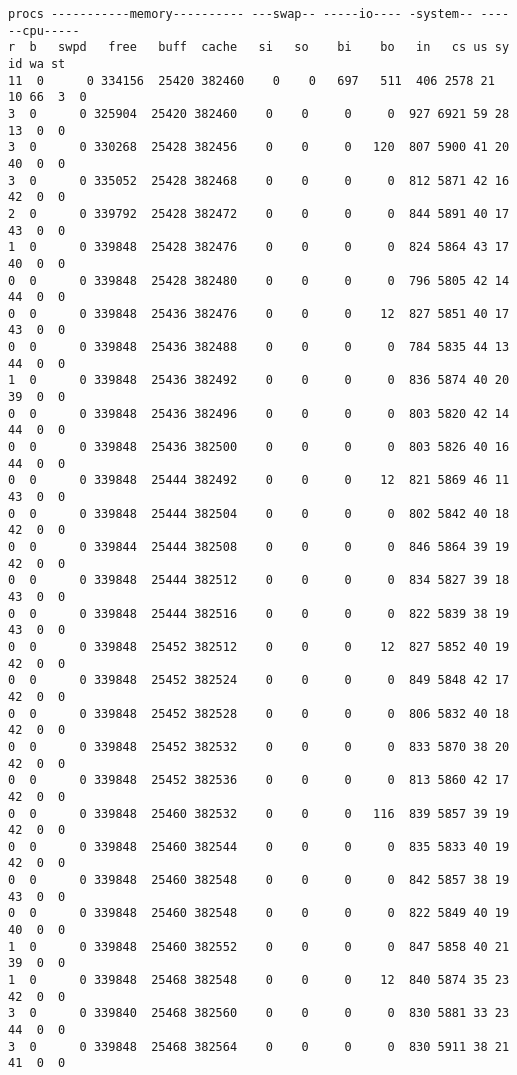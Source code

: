 \begin{lstlisting}[caption={Eerste 50 resultaten}, basicstyle=\footnotesize]
procs -----------memory---------- ---swap-- -----io---- -system-- ------cpu-----
r  b   swpd   free   buff  cache   si   so    bi    bo   in   cs us sy id wa st
11  0      0 334156  25420 382460    0    0   697   511  406 2578 21 10 66  3  0
3  0      0 325904  25420 382460    0    0     0     0  927 6921 59 28 13  0  0
3  0      0 330268  25428 382456    0    0     0   120  807 5900 41 20 40  0  0
3  0      0 335052  25428 382468    0    0     0     0  812 5871 42 16 42  0  0
2  0      0 339792  25428 382472    0    0     0     0  844 5891 40 17 43  0  0
1  0      0 339848  25428 382476    0    0     0     0  824 5864 43 17 40  0  0
0  0      0 339848  25428 382480    0    0     0     0  796 5805 42 14 44  0  0
0  0      0 339848  25436 382476    0    0     0    12  827 5851 40 17 43  0  0
0  0      0 339848  25436 382488    0    0     0     0  784 5835 44 13 44  0  0
1  0      0 339848  25436 382492    0    0     0     0  836 5874 40 20 39  0  0
0  0      0 339848  25436 382496    0    0     0     0  803 5820 42 14 44  0  0
0  0      0 339848  25436 382500    0    0     0     0  803 5826 40 16 44  0  0
0  0      0 339848  25444 382492    0    0     0    12  821 5869 46 11 43  0  0
0  0      0 339848  25444 382504    0    0     0     0  802 5842 40 18 42  0  0
0  0      0 339844  25444 382508    0    0     0     0  846 5864 39 19 42  0  0
0  0      0 339848  25444 382512    0    0     0     0  834 5827 39 18 43  0  0
0  0      0 339848  25444 382516    0    0     0     0  822 5839 38 19 43  0  0
0  0      0 339848  25452 382512    0    0     0    12  827 5852 40 19 42  0  0
0  0      0 339848  25452 382524    0    0     0     0  849 5848 42 17 42  0  0
0  0      0 339848  25452 382528    0    0     0     0  806 5832 40 18 42  0  0
0  0      0 339848  25452 382532    0    0     0     0  833 5870 38 20 42  0  0
0  0      0 339848  25452 382536    0    0     0     0  813 5860 42 17 42  0  0
0  0      0 339848  25460 382532    0    0     0   116  839 5857 39 19 42  0  0
0  0      0 339848  25460 382544    0    0     0     0  835 5833 40 19 42  0  0
0  0      0 339848  25460 382548    0    0     0     0  842 5857 38 19 43  0  0
0  0      0 339848  25460 382548    0    0     0     0  822 5849 40 19 40  0  0
1  0      0 339848  25460 382552    0    0     0     0  847 5858 40 21 39  0  0
1  0      0 339848  25468 382548    0    0     0    12  840 5874 35 23 42  0  0
3  0      0 339840  25468 382560    0    0     0     0  830 5881 33 23 44  0  0
3  0      0 339848  25468 382564    0    0     0     0  830 5911 38 21 41  0  0

\end{lstlisting}
